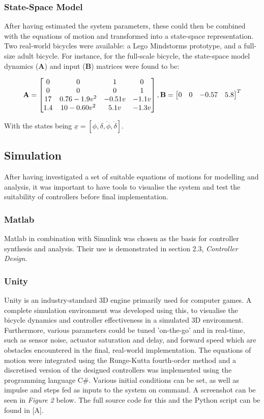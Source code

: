 \documentclass[12pt]{article}
\begin{document}
\subsubsection{State-Space Model}
After having estimated the system parameters, these could then be combined with the equations of motion and transformed into a state-space representation. Two real-world bicycles were available: a Lego Mindstorms prototype, and a full-size adult bicycle.
For instance, for the full-scale bicycle, the state-space model dynamics ($\mathbf{A}$) and input ($\mathbf{B}$) matrices were found to be:

\begin{equation}
\mathbf{A} = \begin{bmatrix}
0 & 0 & 1 & 0 \\
0 & 0 & 0 & 1 \\
17 & 0.76 - 1.9v^2 & -0.51v & -1.1v \\
1.4 & 10-0.60v^2 & 5.1v & -1.3v
\end{bmatrix} \\
, \mathbf{B} = \begin{bmatrix}
0 & 0 & -0.57 & 5.8
\end{bmatrix}^T
\end{equation}

\noindent With the states being $\underline{x}=[\phi, \delta, \dot{\phi}, \dot{\delta}]$.

\subsection{Simulation}
After having investigated a set of suitable equations of motions for modelling and analysis, it was important to have tools to visualise the system and test the suitability of controllers before final implementation.

\subsubsection{Matlab}
Matlab in combination with Simulink was chosen as the basis for controller synthesis and analysis. Their use is demonstrated in section 2.3, \textit{Controller Design}.

\subsubsection{Unity}
Unity is an industry-standard 3D engine primarily used for computer games. A complete simulation environment was developed using this, to visualise the bicycle dynamics and controller effectiveness in a simulated 3D environment. Furthermore, various parameters could be tuned 'on-the-go' and in real-time, such as sensor noise, actuator saturation and delay, and forward speed which are obstacles encountered in the final, real-world implementation. The equations of motion were integrated using the Runge-Kutta fourth-order method and a discretised version of the designed controllers was implemented using the programming language C\#. Various initial conditions can be set, as well as impulse and steps fed as inputs to the system on command. A screenshot can be seen in \textit{Figure 2} below.
The full source code for this and the Python script can be found in [A].
\end{document}

